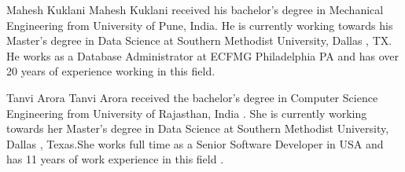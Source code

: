 \documentclass[journal]{hybrid-cloud}
\begin{document}

\begin{IEEEbiographynophoto}{Mahesh Kuklani}
Mahesh Kuklani received his bachelor's degree in Mechanical Engineering from University of Pune, India. He is currently working towards his Master's degree in Data Science at Southern Methodist University, Dallas , TX. He works as a Database Administrator at ECFMG Philadelphia PA and has over 20 years of experience working in this field.

\end{IEEEbiographynophoto}


\begin{IEEEbiographynophoto}{Tanvi Arora}
Tanvi Arora received the bachelor's degree in Computer Science Engineering from University of Rajasthan, India . She is currently working towards her Master's degree in Data Science at Southern Methodist University, Dallas , Texas.She works full time as a Senior Software Developer in USA and has 11 years of work experience in this field .
\end{IEEEbiographynophoto}






\end{document}
